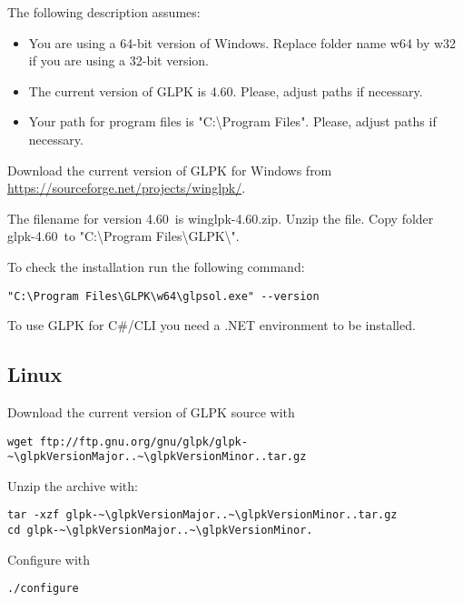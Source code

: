 \documentclass[a4paper,11pt]{report}
\newcommand{\glpkVersionMajor}{4}
\newcommand{\glpkVersionMinor}{60}
\begin{document}
The following description assumes:

\begin{itemize}
\item You are using a 64-bit version of Windows. Replace folder name w64 by w32
if you are using a 32-bit version.
\item The current version of GLPK is \glpkVersionMajor.\glpkVersionMinor.
Please, adjust paths if necessary.
\item Your path for program files is "C:\textbackslash Program Files". Please,
adjust paths if necessary.
\end{itemize}

Download the current version of GLPK for Windows from
\href{https://sourceforge.net/projects/winglpk/}{https://sourceforge.net/projects/winglpk/}.

The filename for version \glpkVersionMajor.\glpkVersionMinor\ is
winglpk-\glpkVersionMajor.\glpkVersionMinor.zip. Unzip the file. Copy folder
glpk-\glpkVersionMajor.\glpkVersionMinor\ to "C:\textbackslash Program
Files\textbackslash GLPK\textbackslash ".

To check the installation run the following command:

\begin{lstlisting}
"C:\Program Files\GLPK\w64\glpsol.exe" --version
\end{lstlisting}

To use GLPK for C\#/CLI you need a .NET environment to be installed.

\subsection{Linux}

Download the current version of GLPK source with

\begin{lstlisting}
wget ftp://ftp.gnu.org/gnu/glpk/glpk-~\glpkVersionMajor..~\glpkVersionMinor..tar.gz
\end{lstlisting}

Unzip the archive with:

\begin{lstlisting}
tar -xzf glpk-~\glpkVersionMajor..~\glpkVersionMinor..tar.gz
cd glpk-~\glpkVersionMajor..~\glpkVersionMinor.
\end{lstlisting}

Configure with

\begin{lstlisting}
./configure
\end{lstlisting}
\end{document}
